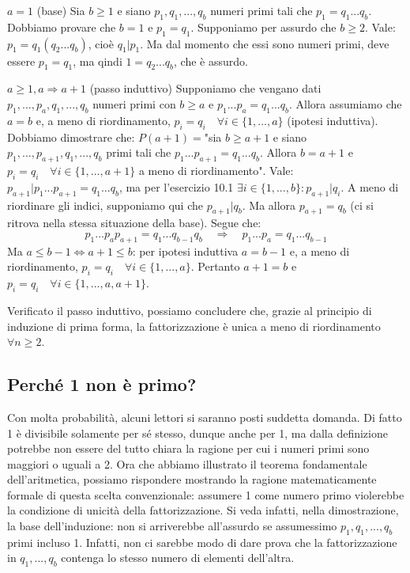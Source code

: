 \documentclass[oneside]{book}
\begin{document}
\begin{tcolorbox}[enhanced, breakable, title={Teorema Fondamentale dell'Aritmetica}]
$a=1$ (base) Sia $b \geq 1$ e siano $p_1,q_1,...,q_b$ numeri primi tali che
$p_1 = q_1...q_b$. Dobbiamo provare che $b=1$ e $p_1 = q_1$. Supponiamo per
assurdo che $b \geq 2$. Vale: $p_1 = q_1(q_2...q_b)$, cioè $q_1|p_1$. Ma dal
momento che essi sono numeri primi, deve essere $p_1 = q_1$,
ma qindi $1 = q_2...q_b$, che è assurdo.

$a \geq 1, a \Rightarrow a+1$ (passo induttivo) Supponiamo che vengano dati $p_1,...,p_a,
q_1,...,q_b$ numeri primi con $b \geq a$ e $p_1...p_a = q_1...q_b$. Allora
assumiamo che $a=b$ e, a meno di riordinamento, $p_i = q_i \quad \forall i \in \{1,...,a\}$
(ipotesi induttiva). Dobbiamo dimostrare che: $P(a+1)= $"sia $b \geq a+1$ e siano
$p_1,...,p_{a+1},q_1,...,q_b$ primi tali che $p_1...p_{a+1} = q_1...q_b$.
Allora $b = a+1$ e $p_i = q_i \quad \forall i \in \{1,...,a+1\}$
a meno di riordinamento". Vale: $p_{a+1}|p_1...p_{a+1} = q_1...q_b$, ma per
l'esercizio 10.1 $\exists i \in \{1,...,b\}: p_{a+1}|q_i$. A meno di riordinare
gli indici, supponiamo qui che $p_{a+1}|q_b$. Ma allora $p_{a+1} = q_b$ (ci si
ritrova nella stessa situazione della base). Segue che:
\[ p_1...p_ap_{a+1} = q_1...q_{b-1}q_b \quad \Rightarrow \quad  p_1...p_a = q_1...q_{b-1} \]
Ma $a \leq b-1 \Leftrightarrow a+1 \leq b$: per ipotesi induttiva $a = b-1$ e,
a meno di riordinamento, $p_i = q_i \quad \forall i \in \{1,...,a\}$. Pertanto
$a+1 = b$ e $p_i = q_i \quad \forall i \in \{1,...,a,a+1\}$.

Verificato il passo induttivo, possiamo concludere che, grazie al principio di
induzione di prima forma, la fattorizzazione è unica a meno di riordinamento
$\forall n \geq 2$.
\cvd
\end{tcolorbox}

\subsection*{Perché 1 non è primo?}
Con molta probabilità, alcuni lettori si saranno posti suddetta domanda. Di fatto
1 è divisibile solamente per sé stesso, dunque anche per 1, ma dalla definizione
potrebbe non essere del tutto chiara la ragione per cui i numeri primi
sono maggiori o uguali a 2. Ora che abbiamo illustrato il teorema fondamentale
dell'aritmetica, possiamo rispondere mostrando la ragione matematicamente
formale di questa scelta convenzionale: assumere 1 come numero primo violerebbe
la condizione di unicità della fattorizzazione. Si veda infatti, nella dimostrazione,
la base dell'induzione: non si arriverebbe
all'assurdo se assumessimo $p_1,q_1,...,q_b$ primi incluso 1. Infatti, non ci
sarebbe modo di dare prova che la fattorizzazione in $q_1,...,q_b$ contenga lo
stesso numero di elementi dell'altra.
\end{document}
